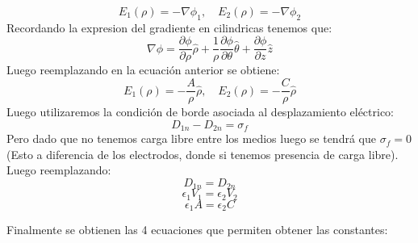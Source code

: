 \documentclass[
  11pt,
  letterpaper,
   addpoints,
  ]{exam}
\begin{document}
\begin{questions}
\begin{solution}
\begin{enumerate}
            \begin{equation}
                E_{1}(\rho) = -\nabla\phi_{1}, \quad E_{2}(\rho) = -\nabla\phi_{2}
            \end{equation}
            Recordando la expresion del gradiente en cilindricas tenemos que:
            \begin{equation}
                \nabla\phi = \frac{\partial \phi}{\partial \rho} \hat{\rho} + \frac{1}{\rho}\frac{\partial \phi}{\partial \theta} \hat{\theta} + \frac{\partial \phi}{\partial z} \hat{z}
            \end{equation}
            Luego reemplazando en la ecuación anterior se obtiene:
            \begin{equation}
                E_{1}(\rho) =-\frac{A}{\rho} \hat{\rho}, \quad E_{2}(\rho) = -\frac{C}{\rho} \hat{\rho}
            \end{equation}
            Luego utilizaremos la condición de borde asociada al desplazamiento eléctrico:
            \begin{equation}
                D_{1n} - D_{2n} = \sigma_{f}
            \end{equation}
            Pero dado que no tenemos carga libre entre los medios luego se tendrá que $\sigma_{f}= 0$ (Esto a diferencia de los electrodos, donde si tenemos presencia de carga libre). Luego reemplazando:
            \begin{equation}
                 D_{1n} = D_{2n}
            \end{equation}
            \begin{equation}
                 \epsilon_{1}V_{1} = \epsilon_{2}V_{2}
            \end{equation}
            \begin{equation}
                 \epsilon_{1}A = \epsilon_{2}C
            \end{equation}
            
            Finalmente se obtienen las 4 ecuaciones que permiten obtener las constantes:
            

\end{enumerate}
\end{solution}
\end{questions}
\end{document}
